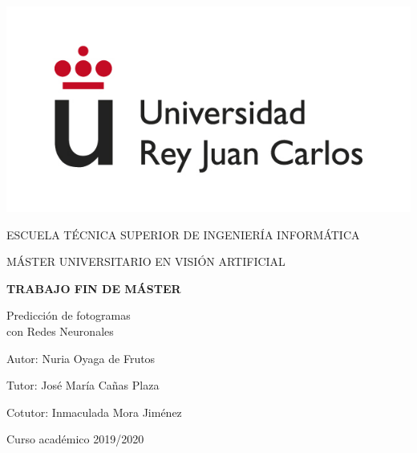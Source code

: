 \begin{titlepage}
	\begin{center}
		\begin{center}
			\includegraphics[width=0.4\linewidth]{figures/logo}
		\end{center}
		\vspace{7.5mm}
		
		\fontsize{15.5}{14}\selectfont ESCUELA TÉCNICA SUPERIOR DE INGENIERÍA INFORMÁTICA
		\vspace{13mm}
		
		\fontsize{14}{14}\selectfont MÁSTER UNIVERSITARIO EN VISIÓN ARTIFICIAL 
		
		\vspace{70pt}
		
		\fontsize{15.7}{14}\selectfont \textbf{TRABAJO FIN DE MÁSTER} 
		
		\vspace{20mm}
		\begin{huge}
			Predicción de fotogramas \vspace{0.4cm} \\ con Redes Neuronales
		\end{huge}
		
		\vspace{35mm}
		
		\begin{large}
			Autor: Nuria Oyaga de Frutos
			
			Tutor: José María Cañas Plaza
			
			Cotutor: Inmaculada Mora Jiménez
			
			\vspace{20mm}
		\end{large}
		\begin{normalsize}
			Curso académico 2019/2020	
		\end{normalsize}
		\vspace{10mm}
		
	\end{center}
	
\end{titlepage}

\pagebreak
\thispagestyle{empty}
\vspace*{12cm}


